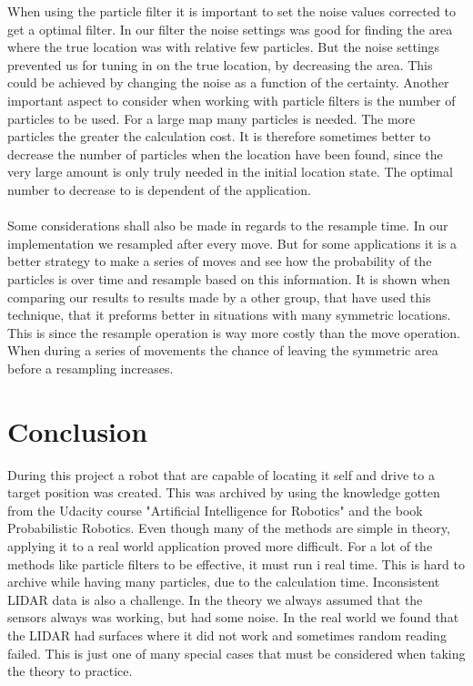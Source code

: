 When using the particle filter it is important to set the noise values corrected to get a optimal filter. In our filter the noise settings was good for finding the area where the true location was with relative few particles. But the noise settings prevented us for tuning in on the true location, by decreasing the area. This could be achieved by changing the noise as a function of the certainty.   
Another important aspect to consider when working with particle filters is the number of particles to be used. For a large map many particles is needed. The more particles the greater the calculation cost. It is therefore sometimes better to decrease the number of particles when the location have been found, since the very large amount is only truly needed in the initial location state. The optimal number to decrease  to is dependent of the application. \\\\
Some considerations shall also be made in regards to the resample time. In our implementation we resampled after every move. But for some applications it is a better strategy to make a series of moves and see how the probability of the particles is over time and resample based on this information. It is shown when comparing our results to results made by a other group, that have used this technique, that it preforms better in situations with many symmetric locations. This is since the resample operation is way more costly than the move operation. When during a series of movements the chance of leaving the symmetric area before a resampling increases. 


\chapter{Conclusion}
During this project a robot that are capable of locating it self and drive to a target position was created. This was archived by using the knowledge gotten from the Udacity course "Artificial Intelligence for Robotics"\cite{AIROK} and the book Probabilistic Robotics\cite{thrun2005probabilistic}. Even though many of the methods are simple in theory, applying it to a real world application proved more difficult. For a lot of the methods like particle filters to be effective, it must run i real time. This is hard to archive while having many particles, due to the calculation time. Inconsistent LIDAR data is also a challenge. In the theory we always assumed that the sensors always was working, but had some noise. In the real world we found that the LIDAR had surfaces where it did not work and sometimes random reading failed. This is just one of many special cases that must be considered when taking the theory to practice.  


